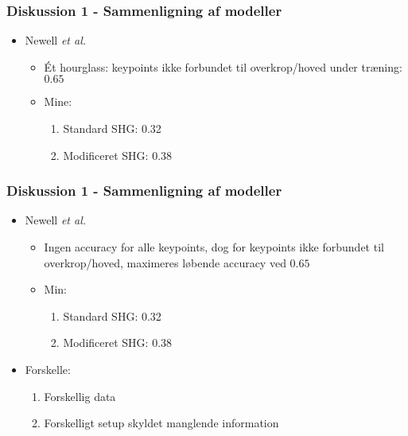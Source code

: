 \documentclass{beamer}
\begin{document}
\begin{frame}
    \frametitle{Diskussion 1 - Sammenligning af modeller}
    \begin{itemize}
        \item<1-> Newell \textit{et al.}
        \begin{itemize}
            \item<1-> Ét hourglass: keypoints ikke forbundet til overkrop/hoved under træning: $0.65$
            \item<1-> Mine:
            \begin{enumerate}
                \item Standard SHG: 0.32
                \item Modificeret SHG: 0.38
            \end{enumerate}
        \end{itemize}
    \end{itemize}
\end{frame}

\begin{frame}
    \frametitle{Diskussion 1 - Sammenligning af modeller}
    \begin{itemize}
        \item<1-> Newell \textit{et al.}
        \begin{itemize}
            \item Ingen accuracy for alle keypoints, dog for keypoints ikke forbundet til overkrop/hoved, maximeres løbende accuracy ved $0.65$
            \item<1-> Min:
            \begin{enumerate}
                \item Standard SHG: 0.32
                \item Modificeret SHG: 0.38
            \end{enumerate}
        \end{itemize}
        \item<1-> Forskelle:
        \begin{enumerate}
            \item Forskellig data
            \item Forskelligt setup skyldet manglende information
        \end{enumerate}
    \end{itemize}
\end{frame}
\end{document}
